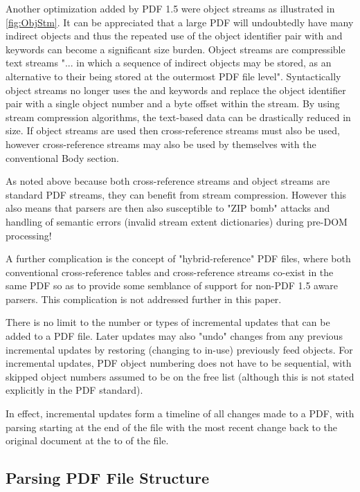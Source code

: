 Another optimization added by PDF 1.5 were object streams as illustrated in \cref{fig:ObjStm}.
It can be appreciated that a large PDF will
undoubtedly have many indirect objects and thus the repeated use of the object identifier pair with   and  keywords can become a significant size burden. Object streams are
compressible text streams "... in which a sequence of indirect objects may be stored, as an 
alternative to their being stored at the outermost PDF file level". 
Syntactically object streams no longer uses the  and  keywords and replace the object identifier pair with a single object number and a byte offset within the stream. 
By using stream compression algorithms, the text-based data can be drastically reduced in size.
If object streams are used then cross-reference streams must also be used, however cross-reference 
streams may also be used by themselves with the conventional Body section.

As noted above because both cross-reference streams and object streams are standard PDF streams, they 
can benefit from stream compression. However this also means that parsers are then also  
susceptible to "ZIP bomb" attacks and handling of semantic errors (invalid stream extent dictionaries) during pre-DOM processing!

A further complication is the concept of "hybrid-reference" PDF files, where both conventional cross-reference tables and cross-reference streams co-exist in the same PDF so as to provide some semblance of support for non-PDF 1.5 aware parsers. This complication is not addressed further in this paper.

There is no limit to the number or types of incremental updates that can be added to a PDF file. Later
updates may also "undo" changes from any previous incremental updates by restoring (changing to in-use)
previously feed objects. For incremental updates, PDF object numbering 
does not have to be sequential, with skipped object numbers assumed to be on
the free list (although this is not stated explicitly in the PDF standard).

In effect, incremental updates form a timeline of all changes made to a PDF, with parsing starting
at the end of the file with the most recent change back to the original document at the to of the file.

\subsection{Parsing PDF File Structure}
\label{sec:parsingfile}

